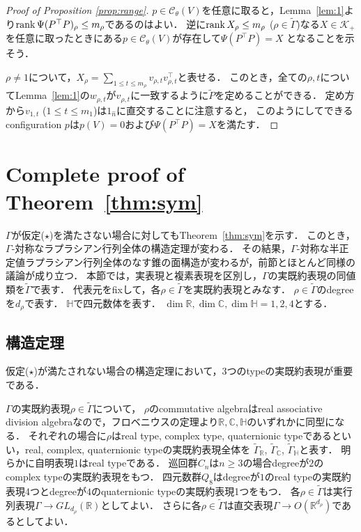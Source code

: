\documentclass[11pt]{article}
\theoremstyle{definition}
\begin{document}
    \begin{proof}[Proof of Proposition \ref{prop:range}]
        $p \in \mathcal{C}_\theta(V)$を任意に取ると，Lemma~\ref{lem:1}より$\rank \Psi(P^\top P)_\rho \leq m_\rho$であるのはよい．
        逆に$\rank X_\rho \leq m_\rho$ ($\rho \in \tilde{\Gamma}$)なる$X \in \mathcal{K}_+$を任意に取ったときにある$p \in \mathcal{C}_\theta(V)$が存在して$\Psi(P^\top P)=X$
        となることを示そう．

        $\rho \neq 1$について，$X_\rho = \sum_{1 \leq t \leq m_\rho} v_{\rho,t} v_{\rho,t}^\top$と表せる．
        このとき，全ての$\rho,t$についてLemma~\ref{lem:1}の$w_{\rho,t}$が$v_{\rho,t}$に一致するように$\tilde{P}$を定めることができる．
        定め方から$v_{1,t}$ ($1 \leq t \leq m_1$)は$1_{\hat{n}}$に直交することに注意すると，
        このようにしてできるconfiguration $p$は$p(V)=0$および$\Psi(P^\top P)=X$を満たす．
        \end{proof}
\section{Complete proof of Theorem~\ref{thm:sym}}
    $\Gamma$が仮定($\star$)を満たさない場合に対してもTheorem~\ref{thm:sym}を示す．
    このとき，$\Gamma$-対称なラプラシアン行列全体の構造定理が変わる．
    その結果，$\Gamma$-対称な半正定値ラプラシアン行列全体のなす錐の面構造が変わるが，前節とほとんど同様の議論が成り立つ．
    本節では，実表現と複素表現を区別し，$\Gamma$の実既約表現の同値類を$\tilde{\Gamma}$で表す．
    代表元をfixして，各$\rho \in \tilde{\Gamma}$を実既約表現とみなす．
    $\rho \in \tilde{\Gamma}$のdegreeを$d_\rho$で表す．
    $\mathbb{H}$で四元数体を表す．
    $\dim \mathbb{R}, \dim \mathbb{C}, \dim \mathbb{H} = 1, 2, 4$とする．
\subsection{構造定理} \label{sec:5.1}
    仮定($\star$)が満たされない場合の構造定理において，3つのtypeの実既約表現が重要である．

    $\Gamma$の実既約表現$\rho \in \tilde{\Gamma}$について，
    $\rho$のcommutative algebraはreal associative division algebraなので，フロベニウスの定理より$\mathbb{R}, \mathbb{C}, \mathbb{H}$のいずれかに同型になる．
    それぞれの場合に$\rho$はreal type, complex type, quaternionic typeであるといい，real, complex, quaternionic typeの実既約表現全体を
    $\tilde{\Gamma}_\mathbb{R}$, $\tilde{\Gamma}_\mathbb{C}$, $\tilde{\Gamma}_\mathbb{H}$と表す．
    明らかに自明表現$1$はreal typeである．
    巡回群$C_n$は$n \geq 3$の場合degreeが$2$のcomplex typeの実既約表現をもつ．
    四元数群$Q_8$はdegreeが$1$のreal typeの実既約表現4つとdegreeが$4$のquaternionic typeの実既約表現1つをもつ．
    各$\rho \in \tilde{\Gamma}$は実行列表現$\Gamma \rightarrow GL_{d_\rho}(\mathbb{R})$としてよい．
    さらに各$\rho \in \tilde{\Gamma}$は直交表現$\Gamma \rightarrow O(\mathbb{R}^{d_\rho})$であるとしてよい．
\end{document}
